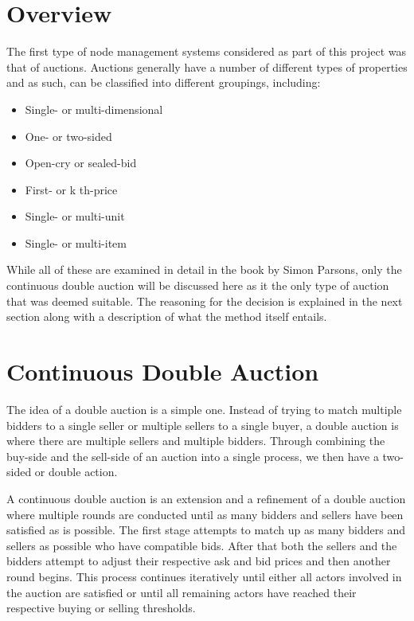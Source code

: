 \documentclass[a4paper, notitlepage]{report}
\begin{document}
\section{Overview}
\label{sec:orgf97b0c4}
The first type of node management systems considered as part of this project was
that of auctions. Auctions generally have a number of different types of
properties \cite{parsons2011auctions} and as such, can be classified into
different groupings, including: 

\begin{itemize}
\item Single- or multi-dimensional
\item One- or two-sided
\item Open-cry or sealed-bid
\item First- or k th-price
\item Single- or multi-unit
\item Single- or multi-item
\end{itemize}

While all of these are examined in detail in the book by Simon Parsons, only the
continuous double auction will be discussed here as it the only type of auction
that was deemed suitable. The reasoning for the decision is explained in the
next section along with a description of what the method itself entails.
\section{Continuous Double Auction}
\label{sec:orgdceb31c}
The idea of a double auction is a simple one. Instead of trying to match
multiple bidders to a single seller or multiple sellers to a single buyer, a
double auction is where there are multiple sellers and multiple bidders. Through
combining the buy-side and the sell-side of an auction into a single process, we
then have a two-sided or double action. 

A continuous double auction is an extension and a refinement of a double auction
where multiple rounds are conducted until as many bidders and sellers have been
satisfied as is possible. The first stage attempts to match up as many bidders
and sellers as possible who have compatible bids. After that both the sellers
and the bidders attempt to adjust their respective ask and bid prices and then
another round begins. This process continues iteratively until either all actors
involved in the auction are satisfied or until all remaining actors have reached
their respective buying or selling thresholds. 
\end{document}
